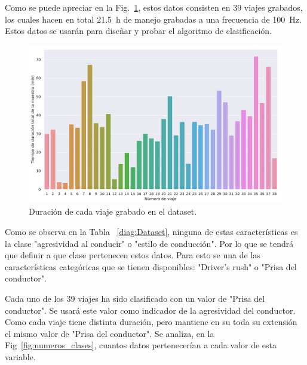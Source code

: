 Como se puede apreciar en la Fig.~\ref{fig:duracion_datps}, estos datos consisten en 39 viajes grabados, los cuales hacen en total \SI{21.5}{h} de manejo grabadas a una frecuencia de \SI{100}{Hz}. Estos datos se usarán para diseñar y probar el algoritmo de clasificación.

\begin{figure}[hbtp!]
\centering
\includegraphics[width=\textwidth]{duracion_viajes.pdf}
\caption{Duración de cada viaje grabado en el dataset.}
\label{fig:duracion_datps}
\end{figure}

Como se observa en la Tabla ~\ref{diag:Dataset}, ninguna de estas características es la clase "agresividad al conducir" o "estilo de conducción". Por lo que se tendrá que definir a que clase pertenecen estos datos. Para esto se una de las características categóricas que se tienen disponibles: "Driver's rush" o "Prisa del conductor".

Cada uno de los 39 viajes ha sido clasificado con un valor de "Prisa del conductor". Se usará este valor como indicador de la agresividad del conductor. Como cada viaje tiene distinta duración, pero mantiene en su toda su extensión el mismo valor de "Prisa del conductor". Se analiza, en la Fig~\ref{fig:numeros_clases}, cuantos datos pertenecerían a cada valor de esta variable.

